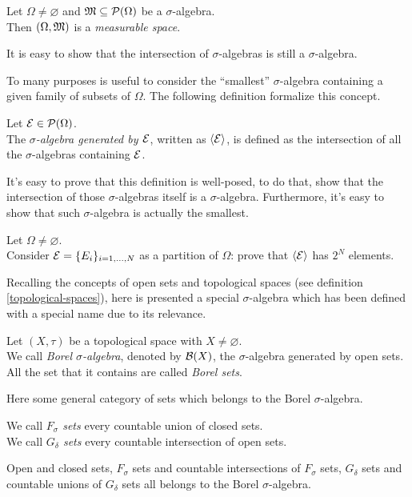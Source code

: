 \begin{defn}
  Let $\Omega \neq \varnothing$ and $\mathfrak M \subseteq \mathcal P(\Omega)$ be a $\sigma$-algebra.\\
  Then $(\Omega, \mathfrak M)$ is a \emph{measurable space}.
\end{defn}

It is easy to show that the intersection of $\sigma$-algebras is still a $\sigma$-algebra.

To many purposes is useful to consider the ``smallest'' $\sigma$-algebra containing a given family of subsets of $\Omega$. The following definition formalize this concept.
\begin{defn}
	Let $\mathcal E \in \mathcal P(\Omega)$.\\
	The \emph{$\sigma$-algebra generated by $\mathcal E$}, written as $\left\langle\mathcal E\right\rangle$, is defined as the intersection of all the $\sigma$-algebras containing $\mathcal E$.
  \end{defn}
It's easy to prove that this definition is well-posed, to do that, show that the intersection of those $\sigma$-algebras itself is a $\sigma$-algebra. Furthermore, it's easy to show that such $\sigma$-algebra is actually the smallest.

\begin{exer}
  Let $\Omega \neq \varnothing$.\\
  Consider $\mathcal E = \{ E_i \}_{i=1,\ldots,N}$ as a partition of $\Omega$: prove that $\left\langle\mathcal E\right\rangle$ has $2^N$ elements.
\end{exer}

Recalling the concepts of open sets and topological spaces (see definition \vref{topological-spaces}), here is presented a special $\sigma$-algebra which has been defined with a special name due to its relevance.
\begin{defn}
  Let $(X, \tau)$ be a topological space with $X \neq \varnothing$. \\
  We call \emph{Borel $\sigma$-algebra}, denoted by $\mathcal B(X)$, the $\sigma$-algebra generated by open sets.\\
  All the set that it contains are called \emph{Borel sets}.
\end{defn}

Here some general category of sets which belongs to the Borel $\sigma$-algebra. 
\begin{defn}\label{F-sigma-G-delta}
	We call \emph{$F_\sigma$ sets} every countable union of closed sets.\\
	We call \emph{$G_\delta$ sets} every countable intersection of open sets. \footnotemark{}
\end{defn}

Open and closed sets, $F_\sigma$ sets and countable intersections of $F_\sigma$ sets, $G_\delta$ sets and countable unions of $G_\delta$ sets all belongs to the Borel $\sigma$-algebra.
